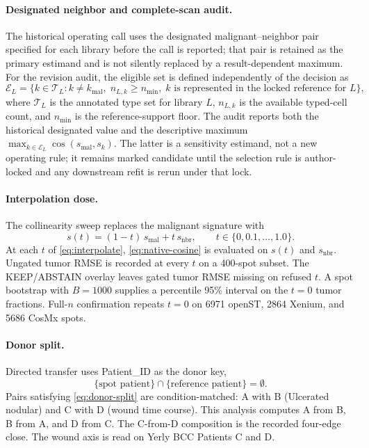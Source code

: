 \paragraph{Designated neighbor and complete-scan audit.}
The historical operating call uses the designated malignant--neighbor pair specified for each library before the call is reported; that pair is retained as the primary estimand and is not silently replaced by a result-dependent maximum. For the revision audit, the eligible set is defined independently of the decision as
\begin{equation}
\mathcal E_L=\{k\in\mathcal T_L: k\neq k_{\mathrm{mal}},\; n_{L,k}\ge n_{\min},\; k\text{ is represented in the locked reference for }L\},
\label{eq:eligible-neighbors}
\end{equation}
where \(\mathcal T_L\) is the annotated type set for library \(L\), \(n_{L,k}\) is the available typed-cell count, and \(n_{\min}\) is the reference-support floor. The audit reports both the historical designated value and the descriptive maximum \(\max_{k\in\mathcal E_L}\cos(s_{\mathrm{mal}},s_k)\). The latter is a sensitivity estimand, not a new operating rule; it remains marked candidate until the selection rule is author-locked and any downstream refit is rerun under that lock.

\paragraph{Interpolation dose.}
The collinearity sweep replaces the malignant signature with
\begin{equation}
s(t)=(1-t)\,s_{\mathrm{mal}}+t\,s_{\mathrm{nbr}},\qquad t\in\{0,0.1,\ldots,1.0\}.
\label{eq:interpolate}
\end{equation}
At each \(t\) of \eqref{eq:interpolate}, \eqref{eq:native-cosine} is evaluated on \(s(t)\) and \(s_{\mathrm{nbr}}\). Ungated tumor RMSE is recorded at every \(t\) on a 400-spot subset. The KEEP/ABSTAIN overlay leaves gated tumor RMSE missing on refused \(t\). A spot bootstrap with \(B=1000\) supplies a percentile 95\% interval on the \(t=0\) tumor fractions. Full-\(n\) confirmation repeats \(t=0\) on 6971 openST, 2864 Xenium, and 5686 CosMx spots.

\paragraph{Donor split.}
Directed transfer uses Patient\_ID as the donor key,
\begin{equation}
\{\text{spot patient}\}\cap\{\text{reference patient}\}=\emptyset.
\label{eq:donor-split}
\end{equation}
Pairs satisfying \eqref{eq:donor-split} are condition-matched: A with B (Ulcerated nodular) and C with D (wound time course). This analysis computes A from B, B from A, and D from C. The C-from-D composition is the recorded four-edge close. The wound axis is read on Yerly BCC Patients C and D.

